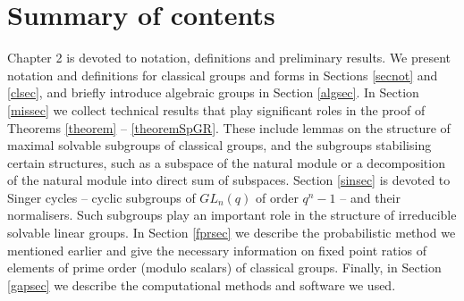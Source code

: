 \section{Summary of contents }

 Chapter 2 is devoted to notation, definitions and preliminary results.  We present notation and definitions for classical groups and forms in Sections \ref{secnot} and \ref{clsec},  and  briefly introduce algebraic groups in Section \ref{algsec}. In Section \ref{missec} we collect technical results that play significant roles in the proof of Theorems \ref{theorem} -- \ref{theoremSpGR}. These include lemmas on the structure of maximal solvable subgroups of classical groups, and the subgroups stabilising certain structures, such as a subspace of the natural module or a decomposition of the natural module into direct sum of subspaces. Section \ref{sinsec} is devoted to  Singer cycles -- cyclic subgroups of $GL_n(q)$ of order $q^n-1$ -- and their normalisers. Such subgroups play an important role in the structure of irreducible solvable linear groups. In Section \ref{fprsec} we describe the probabilistic method we mentioned earlier and give the necessary information on fixed point ratios of elements of prime order (modulo scalars) of classical groups. Finally, in Section \ref{gapsec} we describe the computational methods and software we used.   




